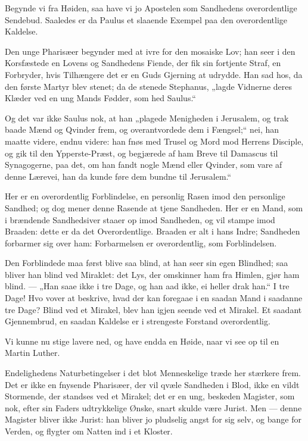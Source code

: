 \documentclass[12pt,a4paper]{book}
\newcommand{\apage}[1]{\marginnote{\footnotesize\textit{[#1]}}}
\begin{document}
Begynde vi fra Høiden, saa have vi jo Apostelen som Sandhedens
overordentlige Sendebud. Saaledes er da Paulus et slaaende Exempel paa den
overordentlige Kaldelse.

Den unge Pharisæer begynder med at ivre for den mosaiske Lov; han seer i
den Korsfæstede en Lovens og Sandhedens Fiende, der fik sin fortjente
Straf, en Forbryder, hvis Tilhængere det er en Guds Gjerning at udrydde.
Han sad hos, da den første Martyr blev stenet; da de stenede Stephanus,
„lagde Vidnerne deres Klæder ved en ung Mands Fødder, som hed Saulus.“

Og det var ikke Saulus nok, at han „plagede Menigheden i Jerusalem, og
trak baade Mænd og Qvinder frem, og overantvordede dem i Fængsel;“ nei,
han maatte videre, endnu videre: han fnøs med Trusel og Mord mod Herrens
Disciple, og gik til den Ypperste-Præst, og begjærede af ham Breve til
Damascus til Synagogerne, paa det, om han fandt nogle Mænd eller Qvinder,
som vare af denne Lærevei, han da kunde føre dem bundne til Jerusalem.“

Her er en overordentlig Forblindelse, en personlig Rasen imod den
personlige Sandhed; og dog mener denne Rasende at tjene Sandheden. Her er
en Mand, som i brændende Sandhedsiver staaer op imod Sandheden, og vil
stampe imod Braaden: dette er da det Overordentlige. Braaden er alt i
hans Indre; Sandheden forbarmer sig over ham: Forbarmelsen er
overordentlig, som Forblindelsen.
 \apage{121}

Den Forblindede maa først blive saa blind, at han seer sin egen Blindhed;
saa bliver han blind ved Miraklet: det Lys, der omskinner ham fra Himlen,
gjør ham blind. — „Han saae ikke i tre Dage, og han aad ikke, ei heller
drak han.“ I tre Dage! Hvo vover at beskrive, hvad der kan foregaae i en
saadan Mand i saadanne tre Dage? Blind ved et Mirakel, blev han igjen
seende ved et Mirakel. Et saadant Gjennembrud, en saadan Kaldelse er i
strengeste Forstand overordentlig.

Vi kunne nu stige lavere ned, og have endda en Høide, naar vi see op til
en Martin Luther.

Endelighedens Naturbetingelser i det blot Menneskelige træde her stærkere
frem. Det er ikke en fnysende Pharisæer, der vil qvæle Sandheden i Blod,
ikke en vildt Stormende, der standses ved et Mirakel; det er en ung,
beskeden Magister, som nok, efter sin Faders udtrykkelige Ønske, snart
skulde være Jurist. Men — denne Magister bliver ikke Jurist: han bliver
jo pludselig angst for sig selv, og bange for Verden, og flygter om
Natten ind i et Kloster.
\end{document}
